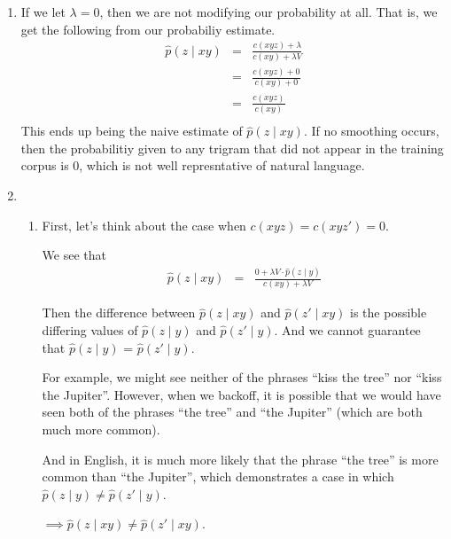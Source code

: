 \documentclass[11pt]{article}
\begin{document}
\begin{enumerate}
\begin{enumerate}[label=(\alph*)]
\begin{enumerate}[label=\roman*.]
		\end{enumerate}
	\item %
		If we let $\lambda = 0$, then we are not modifying our probability at all. That is, we get the following from our probabiliy estimate.
		\begin{eqnarray*}
			\hat{p}(z \mid xy) &=& \frac{c(xyz) + \lambda}{c(xy) + \lambda V} 	\\
							   &=& \frac{c(xyz) + 0}{c(xy) + 0} 				\\
							   &=& \frac{c(xyz)}{c(xy)} 						\\
		\end{eqnarray*}
		This ends up being the naive estimate of $\hat{p}(z \mid xy)$. If no smoothing occurs, then the probabilitiy given to any trigram that did not appear in the training corpus is 0, which is not well represntative of natural language.
	\item %

		\begin{enumerate}[label=\roman*.]
		\item
			First, let's think about the case when $c(xyz) = c(xyz') = 0$. \vspace{4pt}

			We see that
			\begin{eqnarray*}
				\hat{p}(z\mid xy) &=& \frac{0 + \lambda V \cdot \hat{p}(z \mid y)}{c(xy) + \lambda V}
			\end{eqnarray*}

			Then the difference between $\hat{p}(z\mid xy)$ and $\hat{p}(z' \mid xy)$ is the possible differing values of $\hat{p}(z \mid y)$ and $\hat{p}(z' \mid y)$. And we cannot guarantee that $\hat{p}(z \mid y)$ = $\hat{p}(z' \mid y)$. \vspace{4pt}

			For example, we might see neither of the phrases ``kiss the tree'' nor ``kiss the Jupiter''. However, when we backoff, it is possible that we would have seen both of the phrases ``the tree'' and ``the Jupiter'' (which are both much more common). \vspace{4pt}

			And in English, it is much more likely that the phrase ``the tree'' is more common than ``the Jupiter'', which demonstrates a case in which $\hat{p}(z \mid y) \neq \hat{p}(z' \mid y)$. \vspace{4pt}

			$\implies \hat{p}(z\mid xy) \neq \hat{p}(z' \mid xy)$. \vspace{4pt}
			

\end{enumerate}
\end{enumerate}
\end{enumerate}
\end{document}
